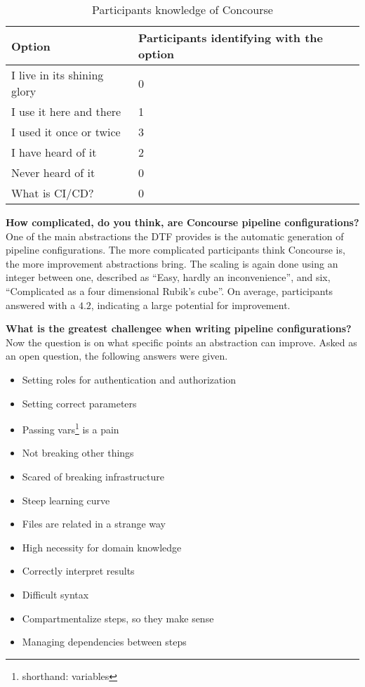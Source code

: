 \begin{table}[h]
    \centering
    \caption{Participants knowledge of Concourse}
    \label{tab:participants-knowledge-of-concourse}
    \begin{tabular}{|l|l|}
        Option & Participants identifying with the option \\
        \hline
        I live in its shining glory & 0 \\
        I use it here and there & 1 \\
        I used it once or twice & 3 \\
        I have heard of it & 2 \\
        Never heard of it & 0 \\
        What is CI/CD? & 0 \\
    \end{tabular}
\end{table}

\textbf{How complicated, do you think, are Concourse pipeline configurations?}\\
One of the main abstractions the DTF provides is the automatic generation of pipeline configurations.
The more complicated participants think Concourse is, the more improvement abstractions bring.
The scaling is again done using an integer between one, described as ``Easy, hardly an inconvenience'', and six, ``Complicated as a four dimensional Rubik's cube''.
On average, participants answered with a $4.2$, indicating a large potential for improvement.

\textbf{What is the greatest challengee when writing pipeline configurations?}\\
Now the question is on what specific points an abstraction can improve.
Asked as an open question, the following answers were given.

\begin{itemize}
    \item Setting roles for authentication and authorization
    \item Setting correct parameters
    \item Passing vars\footnote{shorthand: variables} is a pain
    \item Not breaking other things
    \item Scared of breaking infrastructure
    \item Steep learning curve
    \item Files are related in a strange way
    \item High necessity for domain knowledge
    \item Correctly interpret results
    \item Difficult syntax
    \item Compartmentalize steps, so they make sense
    \item Managing dependencies between steps
\end{itemize}

